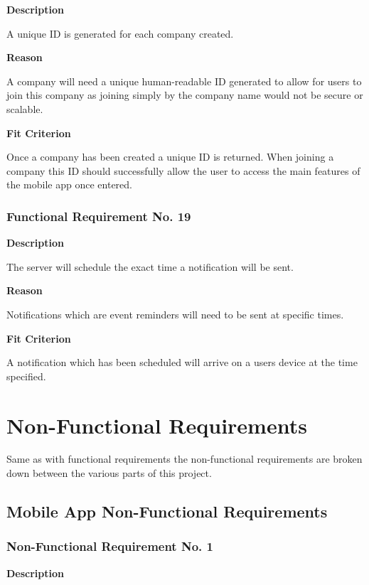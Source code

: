 \textbf{Description}

A unique ID is generated for each company created.

\textbf{Reason}

A company will need a unique human-readable ID generated to allow for users to join this company as joining simply by the company name would not be secure or scalable.

\textbf{Fit Criterion}

Once a company has been created a unique ID is returned. When joining a company this ID should successfully allow the user to access the main features of the mobile app once entered.

\subsubsection{Functional Requirement No. 19}

\textbf{Description}

The server will schedule the exact time a notification will be sent.

\textbf{Reason}

Notifications which are event reminders will need to be sent at specific times.

\textbf{Fit Criterion}

A notification which has been scheduled will arrive on a users device at the time specified.

\section{Non-Functional Requirements}
\label{section:nonfunctionalreq}

Same as with functional requirements the non-functional requirements are broken down between the various parts of this project.

\subsection{Mobile App Non-Functional Requirements}

\subsubsection{Non-Functional Requirement No. 1}

\textbf{Description}

